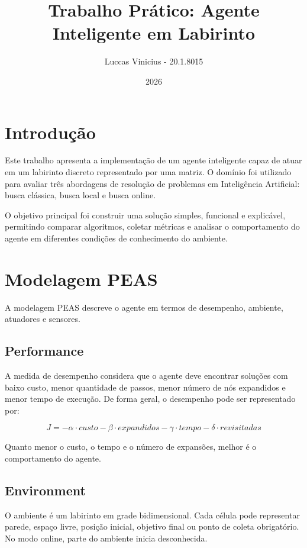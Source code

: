 \documentclass[12pt,a4paper]{article}
\title{Trabalho Prático: Agente Inteligente em Labirinto}
\author{Luccas Vinicius - 20.1.8015}
\date{2026}
\begin{document}
\maketitle

\section{Introdução}

Este trabalho apresenta a implementação de um agente inteligente capaz de atuar em um labirinto discreto representado por uma matriz. O domínio foi utilizado para avaliar três abordagens de resolução de problemas em Inteligência Artificial: busca clássica, busca local e busca online.

O objetivo principal foi construir uma solução simples, funcional e explicável, permitindo comparar algoritmos, coletar métricas e analisar o comportamento do agente em diferentes condições de conhecimento do ambiente.

\section{Modelagem PEAS}

A modelagem PEAS descreve o agente em termos de desempenho, ambiente, atuadores e sensores.

\subsection{Performance}

A medida de desempenho considera que o agente deve encontrar soluções com baixo custo, menor quantidade de passos, menor número de nós expandidos e menor tempo de execução. De forma geral, o desempenho pode ser representado por:

\[
J = -\alpha \cdot custo - \beta \cdot expandidos - \gamma \cdot tempo - \delta \cdot revisitadas
\]

Quanto menor o custo, o tempo e o número de expansões, melhor é o comportamento do agente.

\subsection{Environment}

O ambiente é um labirinto em grade bidimensional. Cada célula pode representar parede, espaço livre, posição inicial, objetivo final ou ponto de coleta obrigatório. No modo online, parte do ambiente inicia desconhecida.
\end{document}
